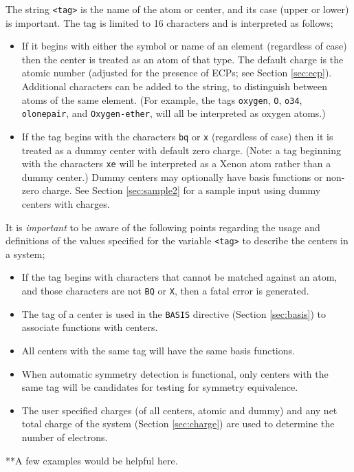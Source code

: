 The string \verb+<tag>+ is the name of the atom or center, and its case
(upper or lower) is important.  The tag is limited to 16 characters
and is interpreted as follows;
\begin{itemize}
\item If it begins with either the symbol or name of an element
  (regardless of case) then the center is treated as an atom of that type.
  The default charge is the atomic number (adjusted for the
  presence of ECPs; see Section \ref{sec:ecp}).  Additional characters can
  be added to the string, to distinguish between atoms of the same element.
  (For example, the tags \verb+oxygen+, \verb+O+, \verb+o34+, \verb+olonepair+,
  and \verb+Oxygen-ether+, will all be interpreted as oxygen
  atoms.)
\item If the tag begins with the characters \verb+bq+ or \verb+x+
  (regardless of case) then it is treated as a dummy center with
  default zero charge.  (Note: a tag beginning with the characters \verb+xe+
  will be interpreted as a Xenon atom rather than a dummy center.)
  Dummy centers may optionally have basis
  functions or non-zero charge.
  See Section \ref{sec:sample2} for
  a sample input using dummy centers with charges.
\end{itemize}

It is {\em important} to be aware of the following points regarding the
usage and definitions of the values specified for the variable \verb+<tag>+
to describe the centers in a system;
\begin{itemize}
\item If the tag begins with characters that cannot be
    matched against an atom, and those characters are not \verb+BQ+ 
    or \verb+X+, then a fatal
    error is generated.
\item The tag of a center is used in the \verb+BASIS+ directive (Section
\ref{sec:basis}) to associate functions with centers.  
\item All centers with the same tag will have the same basis
functions.
\item When automatic symmetry detection is functional, only centers
with the same tag will be candidates for testing for symmetry
equivalence.
\item The user specified charges (of all centers, atomic and dummy)
and any net total charge of the system (Section \ref{sec:charge}) are
used to determine the number of electrons.
\end{itemize}

\Large
**A few examples would be helpful here.
\normalsize

